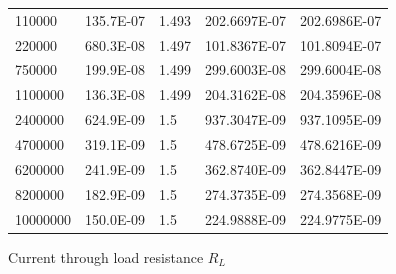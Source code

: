 \documentclass[12pt]{article}
\begin{document}
\begin{figure}[H]
\begin{center}
\begin{tabular}{ P{3cm} P{3cm} P{3cm} P{3cm} P{3cm} }
            110000           & 135.7E-07 & 1.493     & 202.6697E-07            & 202.6986E-07       \\
            220000           & 680.3E-08 & 1.497     & 101.8367E-07            & 101.8094E-07       \\
            750000           & 199.9E-08 & 1.499     & 299.6003E-08            & 299.6004E-08       \\
            1100000          & 136.3E-08 & 1.499     & 204.3162E-08            & 204.3596E-08       \\
            2400000          & 624.9E-09 & 1.5       & 937.3047E-09            & 937.1095E-09       \\
            4700000          & 319.1E-09 & 1.5       & 478.6725E-09            & 478.6216E-09       \\
            6200000          & 241.9E-09 & 1.5       & 362.8740E-09            & 362.8447E-09       \\
            8200000          & 182.9E-09 & 1.5       & 274.3735E-09            & 274.3568E-09       \\
            10000000         & 150.0E-09 & 1.5       & 224.9888E-09            & 224.9775E-09       \\
            \hline
        \end{tabular}
    \end{center}
\end{figure}

\begin{figure}[H]
    \centering
    \caption[12pt]{Current through load resistance $R_L$}
\end{figure}
\end{document}

